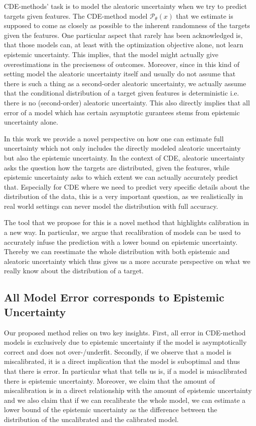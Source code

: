 CDE-methods' task is to model the aleatoric uncertainty when we try to predict targets given features. The CDE-method model $\mathcal{P}_\theta(x)$ that we estimate is supposed to come as closely as possible to the inherent randomness of the targets given the features. One particular aspect that rarely has been acknowledged is, that those models can, at least with the optimization objective alone, not learn epistemic uncertainty. This implies, that the model might actually give overestimations in the preciseness of outcomes. Moreover, since in this kind of setting model the aleatoric uncertainty itself and usually do not assume that there is such a thing as a second-order aleatoric uncertainty, we actually assume that the conditional distribution of a target given features is deterministic i.e. there is no (second-order) aleatoric uncertainty. This also directly implies that all error of a model which has certain asymptotic gurantees stems from epistemic uncertainty alone.

In this work we provide a novel perspective on how one can estimate full uncertainty which not only includes the directly modeled aleatoric uncertainty but also the epistemic uncertainty. In the context of CDE, aleatoric uncertainty asks the question how the targets are distributed, given the features, while epistemic uncertainty asks to which extent we can actually accurately predict that. Especially for CDE where we need to predict very specific details about the distribution of the data, this is a very important question, as we realistically in real world settings can never model the distribution with full accuracy.

The tool that we propose for this is a novel method that highlights calibration in a new way. In particular, we argue that recalibration of models can be used to accurately infuse the prediction with a lower bound on epistemic uncertainty. Thereby we can reestimate the whole distribution with both epistemic and aleatoric uncertainty which thus gives us a more accurate perspective on what we really know about the distribution of a target.

\subsection{All Model Error corresponds to Epistemic Uncertainty}\label{sec:uncertainty_calibration_connection}

Our proposed method relies on two key insights. First, all error in CDE-method models is exclusively due to epistemic uncertainty if the model is asymptotically correct and does not over-/underfit. Secondly, if we observe that a model is miscalibrated, it is a direct implication that the model is suboptimal and thus that there is error. In particular what that tells us is, if a model is misaclibrated there is epistemic uncertainty. Moreover, we claim that the amount of miscalibration is in a direct relationship with the amount of epistemic uncertainty and we also claim that if we can recalibrate the whole model, we can estimate a lower bound of the epistemic uncertainty as the difference between the distribution of the uncalibrated and the calibrated model.

